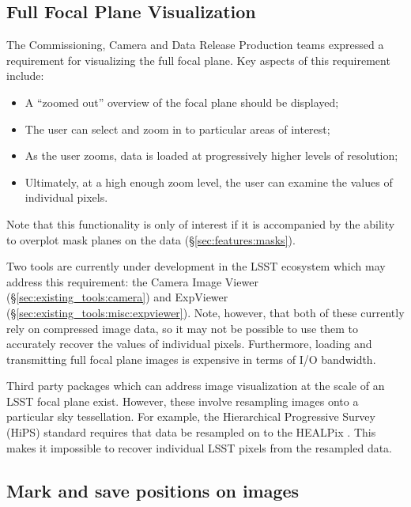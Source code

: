 \subsection{Full Focal Plane Visualization}
\label{sec:features:focal_plane}

The Commissioning, Camera and Data Release Production teams expressed a requirement for visualizing the full focal plane.
Key aspects of this requirement include:

\begin{itemize}

  \item{A ``zoomed out'' overview of the focal plane should be displayed;}
  \item{The user can select and zoom in to particular areas of interest;}
  \item{As the user zooms, data is loaded at progressively higher levels of resolution;}
  \item{Ultimately, at a high enough zoom level, the user can examine the values of individual pixels.}

\end{itemize}

Note that this functionality is only of interest if it is accompanied by the ability to overplot mask planes on the data (\S\ref{sec:features:masks}).

Two tools are currently under development in the LSST ecosystem which may address this requirement: the Camera Image Viewer (\S\ref{sec:existing_tools:camera}) and ExpViewer (\S\ref{sec:existing_tools:misc:expviewer}).
Note, however, that both of these currently rely on compressed image data, so it may not be possible to use them to accurately recover the values of individual pixels.
Furthermore, loading and transmitting full focal plane images is expensive in terms of I/O bandwidth.

Third party packages which can address image visualization at the scale of an LSST focal plane exist.
However, these involve resampling images onto a particular sky tessellation.
For example, the Hierarchical Progressive Survey (HiPS) standard \citep{2017ivoa.spec.0519F} requires that data be resampled on to the HEALPix \citep{gor05}.
This makes it impossible to recover individual LSST pixels from the resampled data.


\subsection{Mark and save positions on images}

